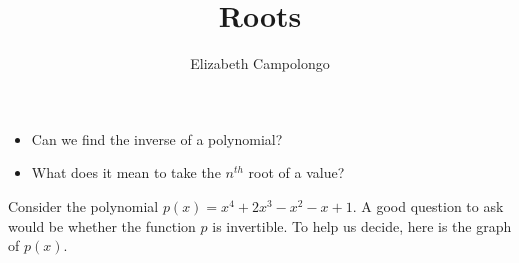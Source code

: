 \documentclass{ximera}
\author{Elizabeth Campolongo}
\title{Roots}
\begin{document}
\begin{abstract}
  
\end{abstract}
\maketitle

\begin{motivatingQuestions}\begin{itemize}
\item Can we find the inverse of a polynomial?
\item What does it mean to take the $n^{th}$ root of a value?
\end{itemize}\end{motivatingQuestions}




%

Consider the polynomial $p(x) = x^4 + 2x^3 - x^2 - x + 1$. A good question to ask would be whether the function $p$ is invertible. To help us decide, here is the graph of $p(x)$.
\begin{image}
\end{image}
\end{document}
